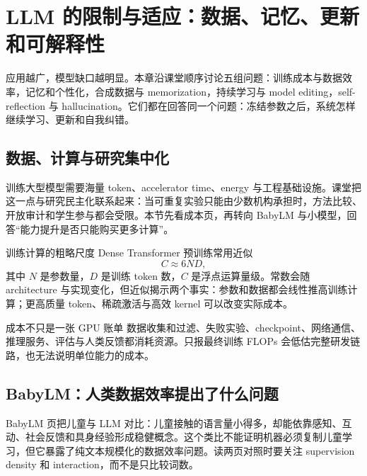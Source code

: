 \section{LLM 的限制与适应：数据、记忆、更新和可解释性}

应用越广，模型缺口越明显。本章沿课堂顺序讨论五组问题：训练成本与数据效率，记忆和个性化，合成数据与 memorization，持续学习与 model editing，self-reflection 与 hallucination。它们都在回答同一个问题：冻结参数之后，系统怎样继续学习、更新和自我纠错。

\subsection{数据、计算与研究集中化}

训练大型模型需要海量 token、accelerator time、energy 与工程基础设施。课堂把这一点与研究民主化联系起来：当可重复实验只能由少数机构承担时，方法比较、开放审计和学生参与都会受限。本节先看成本页，再转向 BabyLM 与小模型，回答“能力提升是否只能购买更多计算”。


\begin{importantbox}{训练计算的粗略尺度}
Dense Transformer 预训练常用近似
\[
C\approx 6ND,
\]
其中 $N$ 是参数量，$D$ 是训练 token 数，$C$ 是浮点运算量级。常数会随 architecture 与实现变化，但近似揭示两个事实：参数和数据都会线性推高训练计算；更高质量 token、稀疏激活与高效 kernel 可以改变实际成本。
\end{importantbox}

\begin{warningbox}{成本不只是一张 GPU 账单}
数据收集和过滤、失败实验、checkpoint、网络通信、推理服务、评估与人类反馈都消耗资源。只报最终训练 FLOPs 会低估完整研发链路，也无法说明单位能力的成本。
\end{warningbox}

\subsection{BabyLM：人类数据效率提出了什么问题}

BabyLM 页把儿童与 LLM 对比：儿童接触的语言量小得多，却能依靠感知、互动、社会反馈和具身经验形成稳健概念。这个类比不能证明机器必须复制儿童学习，但它暴露了纯文本规模化的数据效率问题。读两页对照时要关注 supervision density 和 interaction，而不是只比较词数。


